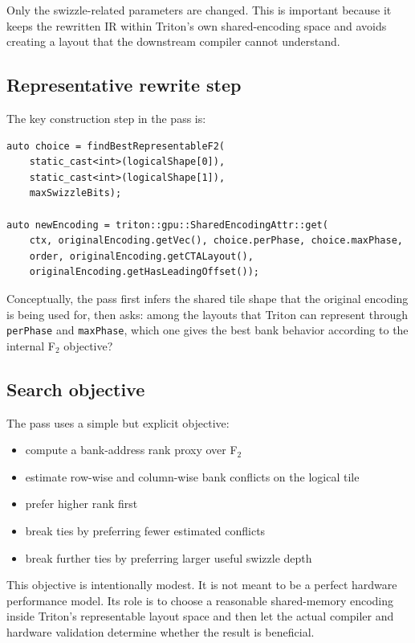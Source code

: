 \documentclass[11pt,a4paper]{article}
\begin{document}
Only the swizzle-related parameters are changed.  This is important because it
keeps the rewritten IR within Triton's own shared-encoding space and avoids
creating a layout that the downstream compiler cannot understand.

\subsection{Representative rewrite step}

The key construction step in the pass is:

\begin{lstlisting}[caption={Core rewrite step in \texttt{F2SharedLayout.cpp}}]
auto choice = findBestRepresentableF2(
    static_cast<int>(logicalShape[0]),
    static_cast<int>(logicalShape[1]),
    maxSwizzleBits);

auto newEncoding = triton::gpu::SharedEncodingAttr::get(
    ctx, originalEncoding.getVec(), choice.perPhase, choice.maxPhase,
    order, originalEncoding.getCTALayout(),
    originalEncoding.getHasLeadingOffset());
\end{lstlisting}

Conceptually, the pass first infers the shared tile shape that the original
encoding is being used for, then asks: among the layouts that Triton can
represent through \texttt{perPhase} and \texttt{maxPhase}, which one gives the
best bank behavior according to the internal F$_2$ objective?

\subsection{Search objective}

The pass uses a simple but explicit objective:

\begin{itemize}
\item compute a bank-address rank proxy over F$_2$
\item estimate row-wise and column-wise bank conflicts on the logical tile
\item prefer higher rank first
\item break ties by preferring fewer estimated conflicts
\item break further ties by preferring larger useful swizzle depth
\end{itemize}

This objective is intentionally modest.  It is not meant to be a perfect
hardware performance model.  Its role is to choose a reasonable shared-memory
encoding inside Triton's representable layout space and then let the actual
compiler and hardware validation determine whether the result is beneficial.
\end{document}
